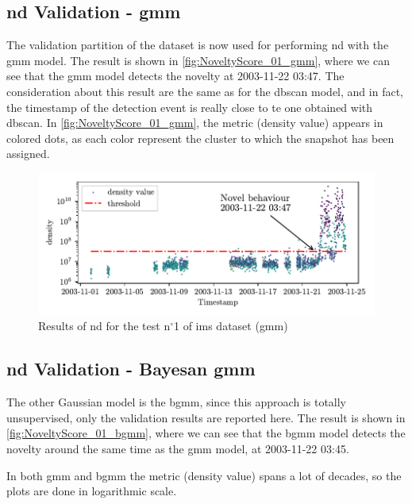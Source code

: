 \subsection{\gls{nd} Validation - \gls{gmm}}
The validation partition of the dataset is now used for performing \gls{nd} with the \gls{gmm} model. The result is shown in \autoref{fig:NoveltyScore_01_gmm}, where we can see that the \gls{gmm} model detects the novelty at 2003-11-22 03:47. The consideration about this result are the same as for the \gls{dbscan} model, and in fact, the timestamp of the detection event is really close to te one obtained with \gls{dbscan}. In \autoref{fig:NoveltyScore_01_gmm}, the metric (density value) appears in colored dots, as each color represent the cluster to which the snapshot has been assigned.
\begin{figure}
    \centering
    \includegraphics{images/IMS/Novelty_01_500samples_bearing3x_gmm.pdf}
    \caption{Results of \gls{nd} for the test $\text{n}^\circ$1 of \gls{ims} dataset (\gls{gmm})}
    \label{fig:NoveltyScore_01_gmm}
\end{figure}

\subsection{\gls{nd} Validation - Bayesan \gls{gmm}}
The other Gaussian model is the \gls{bgmm}, since this approach is totally unsupervised, only the validation results are reported here. The result is shown in \autoref{fig:NoveltyScore_01_bgmm}, where we can see that the \gls{bgmm} model detects the novelty around the same time as the \gls{gmm} model, at 2003-11-22 03:45.

In both \gls{gmm} and \gls{bgmm} the metric (density value) spans a lot of decades, so the plots are done in logarithmic scale.

